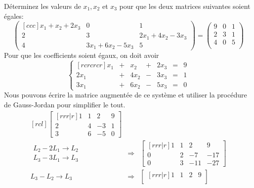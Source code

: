 \begin{exemple}
    Déterminez les valeurs de $x_1, x_2$ et $x_3$ pour que les deux matrices
    suivantes soient égales:
    \[
    \begin{pmatrix}[ccc]
    x_1+x_2+ 2x_3  & 0  & 1 \\
    2 & 3 & 2x_1 + 4x_2 - 3x_3 \\
    4 & 3x_1 + 6x_2 - 5x_3 & 5
    \end{pmatrix}
    =
    \begin{pmatrix}
    9 & 0 & 1\\
    2 & 3 & 1 \\
    4 & 0 & 5\\
    \end{pmatrix}
    \]
    \solution
    Pour que les coefficients soient égaux, on doit avoir
    \[
    \left\{
        \begin{matrix}[rcrcrcr]
        x_1 & + & x_2 &+& 2x_3 &=& 9 \\
        2x_1 &+& 4x_2 &-& 3x_3 &=& 1 \\
        3x_1 &+& 6x_2 &-& 5x_3 &=& 0
        \end{matrix}
        \right.
    \]
    Nous pouvons écrire la matrice augmentée de ce système et utiliser la
    procédure de Gauss-Jordan pour simplifier le tout.
    \[
    \begin{matrix}[rcl]
        \begin{bmatrix}[rrr|r]
        1 & 1 & 2 & 9 \\
        2 & 4 & -3 & 1 \\
        3 & 6 & -5 & 0
        \end{bmatrix} \\[20pt]
        \begin{matrix}
        L_2 - 2L_1 \rightarrow L_2 \\
        L_3 - 3L_1 \rightarrow L_3
        \end{matrix}
        &\Longrightarrow&
        \begin{bmatrix}[rrr|r]
        1 & 1 & 2 & 9 \\
        0 & 2 & -7 & -17 \\
        0 & 3 & -11 & -27
        \end{bmatrix} \\[20pt]
        L_3 - L_2 \rightarrow L_3
        &\Longrightarrow&
        \begin{bmatrix}[rrr|r]
        1 & 1 & 2 & 9 \\

\end{bmatrix}
\end{matrix}\]
\end{exemple}
